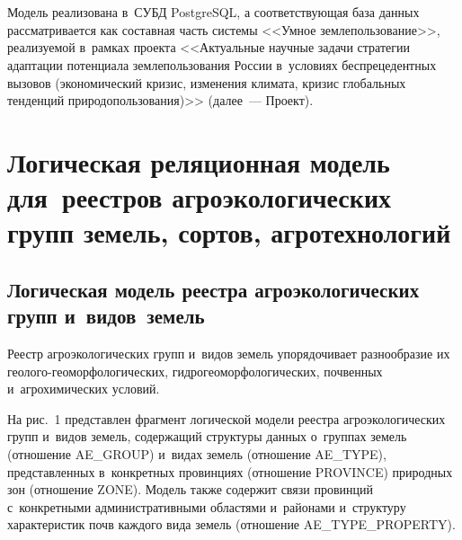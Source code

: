\begin{multicols}{2}
\begin{figure*}[b] %
\vspace*{1pt}
\begin{center}
   \mbox{%
\epsfxsize=160mm
}
\end{center}
\vspace*{-9pt}
\vspace*{12pt}
\begin{center}
   \mbox{%
\epsfxsize=123mm
}
\end{center}
\vspace*{-9pt}
\end{figure*}

    
    Модель реализована в~СУБД PostgreSQL, а соответствующая база 
данных рассматривается как составная часть системы <<Умное 
землепользование>>, реализуемой в~рамках проекта <<Актуальные научные 
задачи стратегии адаптации потенциала землепользования России в~условиях 
беспрецедентных вызовов (экономический кризис, изменения климата, 
кризис глобальных тенденций природопользования)>> (далее~--- 
Проект). 
    
\section{Логическая реляционная модель для~реестров 
агроэкологических групп земель, сортов, агротехнологий}

\subsection{Логическая модель реестра агроэкологических групп и~видов~земель}

    Реестр агроэкологических групп и~видов земель упорядочивает 
разнообразие их геолого-геоморфологических, гидрогеоморфологических, 
почвенных и~агрохимических условий. 
    
    На рис.~1 представлен фрагмент логической модели реестра 
агроэкологических групп и~видов земель, содержащий структуры данных 
о~группах земель (отношение AE\_GROUP) и~видах земель (\mbox{отношение} 
AE\_TYPE), представленных в~конкретных провинциях (отношение 
PROVINCE) природных зон (отношение ZONE). Модель также содержит 
связи провинций с~конкретными административными областями и~районами 
и~структуру характеристик почв каждого вида земель (отношение 
AE\_TYPE\_PROPERTY). 


\end{multicols}
